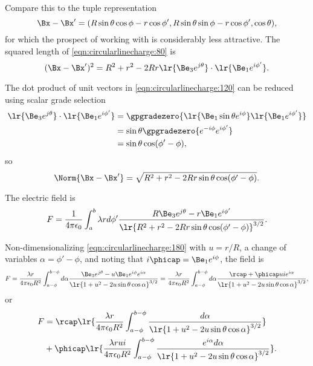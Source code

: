 Compare this to the tuple representation
\begin{dmath}\label{eqn:circularlinecharge:100}
\Bx - \Bx'
= ( R \sin\theta \cos\phi - r \cos\phi', R \sin\theta \sin\phi - r \cos\phi', \cos\theta ),
\end{dmath}
for which the prospect of working with is considerably less attractive.
The squared length of \cref{eqn:circularlinecharge:80} is
\begin{equation}\label{eqn:circularlinecharge:120}
(\Bx - \Bx')^2
=
R^2 + r^2 - 2 R r \lr{\Be_3 e^{j \theta} } \cdot \lr{ \Be_1 e^{i \phi'} }.
\end{equation}

The dot product of unit vectors in \cref{eqn:circularlinecharge:120} can be reduced using scalar grade selection
\begin{equation}\label{eqn:circularlinecharge:140}
\begin{aligned}
\lr{\Be_3 e^{j \theta }} \cdot \lr{ \Be_1 e^{i \phi'} }
&=
\gpgradezero{
\lr{ \Be_1 \sin\theta e^{i \phi} } \lr{ \Be_1 e^{i \phi'}}
} \\
&=
\sin\theta
\gpgradezero{
e^{-i \phi} e^{i \phi'}
} \\
&=
\sin\theta \cos( \phi' - \phi ),
\end{aligned}
\end{equation}
so
\begin{equation}\label{eqn:circularlinecharge:160}
\Norm{ \Bx - \Bx' }
=
\sqrt{
R^2 + r^2 - 2 R r \sin\theta \cos( \phi' - \phi )
}.
\end{equation}

The electric field is
\begin{equation}\label{eqn:circularlinecharge:180}
F = \frac{1}{4 \pi \epsilon_0} \int_a^b \lambda r d\phi' \frac{ R \Be_3 e^{j \theta } - r \Be_1 e^{i \phi'} }{\lr{ R^2 + r^2 - 2 R r \sin\theta \cos( \phi' - \phi ) }^{3/2} }.
\end{equation}

Non-dimensionalizing \cref{eqn:circularlinecharge:180} with \( u = r/R \), a change of variables \( \alpha = \phi' - \phi \), and noting that \( i \phicap = \Be_1 e^{i \phi} \), the field is
\begin{dmath}\label{eqn:circularlinecharge:200}
F
= \frac{\lambda r}{4 \pi \epsilon_0 R^2} \int_{a-\phi}^{b-\phi} d\alpha \frac{ \Be_3 e^{j \theta } - u \Be_1 e^{i\phi} e^{i \alpha} }{\lr{ 1 + u^2 - 2 u \sin\theta \cos \alpha }^{3/2} }
= \frac{\lambda r}{4 \pi \epsilon_0 R^2} \int_{a-\phi}^{b-\phi} d\alpha \frac{ \rcap + \phicap u i e^{i \alpha } }{\lr{ 1 + u^2 - 2 u \sin\theta \cos \alpha }^{3/2} },
\end{dmath}
or
\begin{equation}\label{eqn:circularlinecharge:220}
\begin{aligned}
F
&= \rcap \lr{ \frac{\lambda r}{4 \pi \epsilon_0 R^2} \int_{a-\phi}^{b-\phi} \frac{ d\alpha }{\lr{ 1 + u^2 - 2 u \sin\theta \cos \alpha }^{3/2} } } \\
&+ \phicap \lr{
\frac{\lambda r u i}{4 \pi \epsilon_0 R^2} \int_{a-\phi}^{b-\phi} \frac{ e^{i \alpha } d\alpha }{\lr{ 1 + u^2 - 2 u \sin\theta \cos \alpha }^{3/2} }
}.
\end{aligned}
\end{equation}

